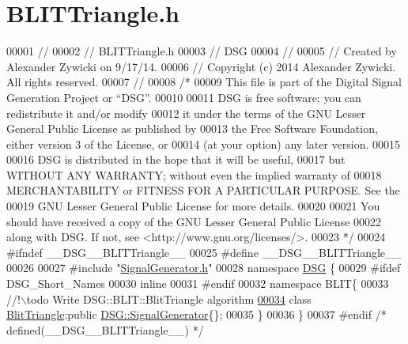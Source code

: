 \hypertarget{_b_l_i_t_triangle_8h_source}{\section{B\+L\+I\+T\+Triangle.\+h}
\label{_b_l_i_t_triangle_8h_source}
}

\begin{DoxyCode}
00001 \textcolor{comment}{//}
00002 \textcolor{comment}{//  BLITTriangle.h}
00003 \textcolor{comment}{//  DSG}
00004 \textcolor{comment}{//}
00005 \textcolor{comment}{//  Created by Alexander Zywicki on 9/17/14.}
00006 \textcolor{comment}{//  Copyright (c) 2014 Alexander Zywicki. All rights reserved.}
00007 \textcolor{comment}{//}
00008 \textcolor{comment}{/*}
00009 \textcolor{comment}{ This file is part of the Digital Signal Generation Project or “DSG”.}
00010 \textcolor{comment}{}
00011 \textcolor{comment}{ DSG is free software: you can redistribute it and/or modify}
00012 \textcolor{comment}{ it under the terms of the GNU Lesser General Public License as published by}
00013 \textcolor{comment}{ the Free Software Foundation, either version 3 of the License, or}
00014 \textcolor{comment}{ (at your option) any later version.}
00015 \textcolor{comment}{}
00016 \textcolor{comment}{ DSG is distributed in the hope that it will be useful,}
00017 \textcolor{comment}{ but WITHOUT ANY WARRANTY; without even the implied warranty of}
00018 \textcolor{comment}{ MERCHANTABILITY or FITNESS FOR A PARTICULAR PURPOSE.  See the}
00019 \textcolor{comment}{ GNU Lesser General Public License for more details.}
00020 \textcolor{comment}{}
00021 \textcolor{comment}{ You should have received a copy of the GNU Lesser General Public License}
00022 \textcolor{comment}{ along with DSG.  If not, see <http://www.gnu.org/licenses/>.}
00023 \textcolor{comment}{ */}
00024 \textcolor{preprocessor}{#ifndef \_\_DSG\_\_BLITTriangle\_\_}
00025 \textcolor{preprocessor}{#define \_\_DSG\_\_BLITTriangle\_\_}
00026 
00027 \textcolor{preprocessor}{#include "\hyperlink{_signal_generator_8h}{SignalGenerator.h}"}
00028 \textcolor{keyword}{namespace }\hyperlink{namespace_d_s_g}{DSG} \{
00029 \textcolor{preprocessor}{#ifdef DSG\_Short\_Names}
00030     \textcolor{keyword}{inline}
00031 \textcolor{preprocessor}{#endif}
00032     \textcolor{keyword}{namespace }BLIT\{\textcolor{comment}{}
00033 \textcolor{comment}{        //!\(\backslash\)todo Write DSG::BLIT::BlitTriangle algorithm}
\hypertarget{_b_l_i_t_triangle_8h_source_l00034}{}\hyperlink{class_d_s_g_1_1_b_l_i_t_1_1_blit_triangle}{00034} \textcolor{comment}{}        \textcolor{keyword}{class }\hyperlink{class_d_s_g_1_1_b_l_i_t_1_1_blit_triangle}{BlitTriangle}:\textcolor{keyword}{public} \hyperlink{class_d_s_g_1_1_signal_generator}{DSG::SignalGenerator}\{\};
00035     \}
00036 \}
00037 \textcolor{preprocessor}{#endif }\textcolor{comment}{/* defined(\_\_DSG\_\_BLITTriangle\_\_) */}\textcolor{preprocessor}{}
\end{DoxyCode}
